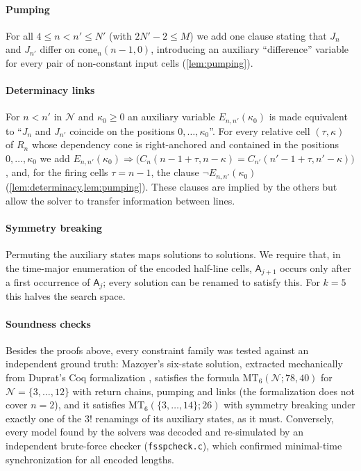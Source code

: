 \paragraph{Pumping} For all $4\le n<n'\le N'$ (with $2N'-2\le M$) we add one
clause stating that $J_n$ and $J_{n'}$ differ on $\mathrm{cone}_n(n-1,0)$,
introducing an auxiliary ``difference'' variable for every pair of
non-constant input cells (\cref{lem:pumping}).

\paragraph{Determinacy links} For $n<n'$ in $\mathcal N$ and $\kappa_0\ge0$ an
auxiliary variable $E_{n,n'}(\kappa_0)$ is made equivalent to ``$J_n$ and $J_{n'}$
coincide on the positions $0,\dots,\kappa_0$''. For every relative cell
$(\tau,\kappa)$ of $R_n$ whose dependency cone is right-anchored and contained
in the positions $0,\dots,\kappa_0$ we add
$E_{n,n'}(\kappa_0)\Rightarrow\bigl(C_n(n-1+\tau,n-\kappa)=C_{n'}(n'-1+\tau,n'-\kappa)\bigr)$,
and, for the firing cells $\tau=n-1$, the clause $\neg E_{n,n'}(\kappa_0)$
(\cref{lem:determinacy,lem:pumping}). These clauses are implied by the
others but allow the solver to transfer information between lines.

\paragraph{Symmetry breaking} Permuting the auxiliary states maps
solutions to solutions. We require that, in the time-major enumeration of
the encoded half-line cells, $\mathsf A_{j+1}$ occurs only after a first
occurrence of $\mathsf A_{j}$; every solution can be renamed to satisfy
this. For $k=5$ this halves the search space.

\paragraph{Soundness checks}
Besides the proofs above, every constraint family was tested against an
independent ground truth: Mazoyer's six-state solution, extracted
mechanically from Duprat's Coq formalization \cite{Duprat97}, satisfies
the formula $\mathrm{MT}_6(\mathcal N;78,40)$ for
$\mathcal N=\{3,\dots,12\}$ with return chains, pumping and links (the
formalization does not cover $n=2$), and it satisfies
$\mathrm{MT}_6(\{3,\dots,14\};26)$ with symmetry breaking under exactly one
of the $3!$ renamings of its auxiliary states, as it must. Conversely, every
model found by the solvers was decoded and re-simulated by an independent
brute-force checker (\texttt{fsspcheck.c}), which confirmed minimal-time
synchronization for all encoded lengths.
